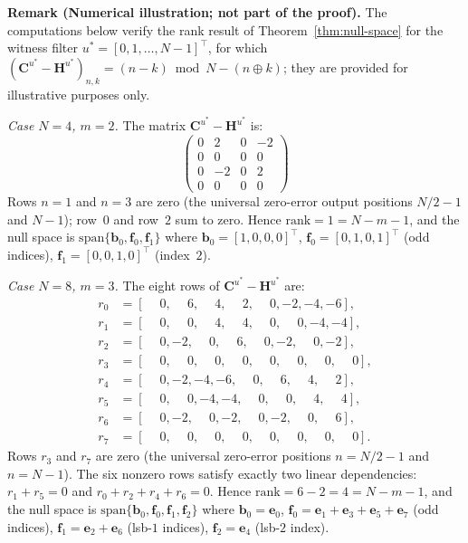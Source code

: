 \documentclass[11pt]{article}
\begin{document}
\medskip
\noindent\textbf{Remark (Numerical illustration; not part of the proof).} The computations below verify the rank result of Theorem~\ref{thm:null-space} for the witness filter $u^* = [0,1,\ldots,N-1]^\top$, for which $(\mathbf{C}^{u^*}-\mathbf{H}^{u^*})_{n,k} = (n-k)\bmod N - (n\oplus k)$; they are provided for illustrative purposes only.

\smallskip
\noindent\textit{Case $N=4$, $m=2$.} The matrix $\mathbf{C}^{u^*}-\mathbf{H}^{u^*}$ is:
\[
\begin{pmatrix}
 0 &  2 & 0 & -2 \\
 0 &  0 & 0 &  0 \\
 0 & -2 & 0 &  2 \\
 0 &  0 & 0 &  0
\end{pmatrix}
\]
Rows $n=1$ and $n=3$ are zero (the universal zero-error output positions $N/2-1$ and $N-1$); row~$0$ and row~$2$ sum to zero. Hence $\mathrm{rank}=1=N-m-1$, and the null space is $\mathrm{span}\{\mathbf{b}_0,\mathbf{f}_0,\mathbf{f}_1\}$ where $\mathbf{b}_0=[1,0,0,0]^\top$, $\mathbf{f}_0=[0,1,0,1]^\top$ (odd indices), $\mathbf{f}_1=[0,0,1,0]^\top$ (index~$2$).

\smallskip
\noindent\textit{Case $N=8$, $m=3$.} The eight rows of $\mathbf{C}^{u^*}-\mathbf{H}^{u^*}$ are:
\begin{align*}
r_0 &= [\phantom{-}0,\phantom{-}6,\phantom{-}4,\phantom{-}2,\phantom{-}0,-2,-4,-6],\\
r_1 &= [\phantom{-}0,\phantom{-}0,\phantom{-}4,\phantom{-}4,\phantom{-}0,\phantom{-}0,-4,-4],\\
r_2 &= [\phantom{-}0,-2,\phantom{-}0,\phantom{-}6,\phantom{-}0,-2,\phantom{-}0,-2],\\
r_3 &= [\phantom{-}0,\phantom{-}0,\phantom{-}0,\phantom{-}0,\phantom{-}0,\phantom{-}0,\phantom{-}0,\phantom{-}0],\\
r_4 &= [\phantom{-}0,-2,-4,-6,\phantom{-}0,\phantom{-}6,\phantom{-}4,\phantom{-}2],\\
r_5 &= [\phantom{-}0,\phantom{-}0,-4,-4,\phantom{-}0,\phantom{-}0,\phantom{-}4,\phantom{-}4],\\
r_6 &= [\phantom{-}0,-2,\phantom{-}0,-2,\phantom{-}0,-2,\phantom{-}0,\phantom{-}6],\\
r_7 &= [\phantom{-}0,\phantom{-}0,\phantom{-}0,\phantom{-}0,\phantom{-}0,\phantom{-}0,\phantom{-}0,\phantom{-}0].
\end{align*}
Rows $r_3$ and $r_7$ are zero (the universal zero-error positions $n=N/2-1$ and $n=N-1$). The six nonzero rows satisfy exactly two linear dependencies: $r_1+r_5=0$ and $r_0+r_2+r_4+r_6=0$. Hence $\mathrm{rank}=6-2=4=N-m-1$, and the null space is $\mathrm{span}\{\mathbf{b}_0,\mathbf{f}_0,\mathbf{f}_1,\mathbf{f}_2\}$ where $\mathbf{b}_0=\mathbf{e}_0$, $\mathbf{f}_0=\mathbf{e}_1+\mathbf{e}_3+\mathbf{e}_5+\mathbf{e}_7$ (odd indices), $\mathbf{f}_1=\mathbf{e}_2+\mathbf{e}_6$ (lsb-$1$ indices), $\mathbf{f}_2=\mathbf{e}_4$ (lsb-$2$ index).
\end{document}
